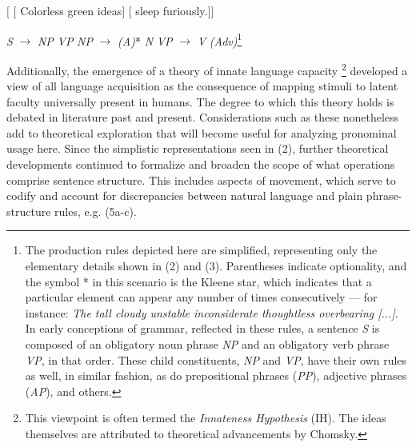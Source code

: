 \documentclass{article}
\begin{document}
\ea \label{FirstTree}
\z

\ea
$[$ $[$ Colorless green ideas$]$ $[$ sleep furiously.$]]$
\z

\ea \label{ProductionRules}
    \begin{xlist}
    \ex \textit{S} $\rightarrow$ \textit{NP} \textit{VP}
    \ex \textit{NP} $\rightarrow$ \textit{(A)}* \textit{N}
    \ex \textit{VP} $\rightarrow$ \textit{V} \textit{(Adv)}\footnote{The production rules depicted here are simplified, representing only the elementary details shown in (2) and (3). Parentheses indicate optionality, and the symbol * in this scenario is the Kleene star, which indicates that a particular element can appear any number of times consecutively — for instance: \textit{The tall cloudy unstable inconsiderate thoughtless overbearing [...]}. In early conceptions of grammar, reflected in these rules, a sentence \textit{S} is composed of an obligatory noun phrase \textit{NP} and an obligatory verb phrase \textit{VP}, in that order. These child constituents, \textit{NP} and \textit{VP}, have their own rules as well, in similar fashion, as do prepositional phrases (\textit{PP}), adjective phrases (\textit{AP}), and others.}
    \end{xlist}
\z

Additionally, the emergence of a theory of innate language capacity \citep{Putnam67, Wasow73}\footnote{This viewpoint is often termed the \textit{Innateness Hypothesis} (IH). The ideas themselves are attributed to theoretical advancements by Chomsky.} developed a view of all language acquisition as the consequence of mapping stimuli to latent faculty universally present in humans. The degree to which this theory holds is debated in literature past and present. Considerations such as these nonetheless add to theoretical exploration that will become useful for analyzing pronominal usage here. Since the simplistic representations seen in (2), further theoretical developments continued to formalize and broaden the scope of what operations comprise sentence structure. This includes aspects of movement, which serve to codify and account for discrepancies between natural language and plain phrase-structure rules, e.g. (5a-c).
\end{document}
